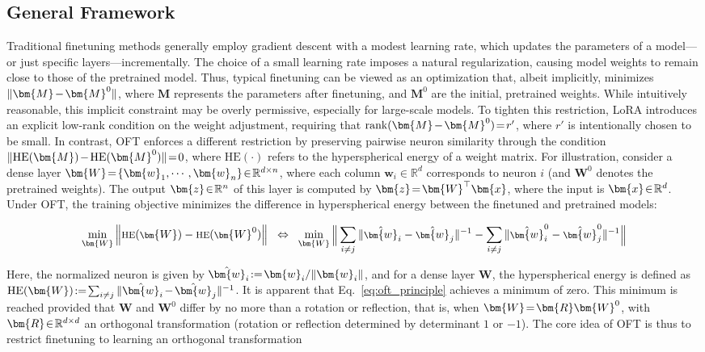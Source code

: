 \subsection{General Framework}

Traditional finetuning methods generally employ gradient descent with a modest learning rate, which updates the parameters of a model—or just specific layers—incrementally. The choice of a small learning rate imposes a natural regularization, causing model weights to remain close to those of the pretrained model. Thus, typical finetuning can be viewed as an optimization that, albeit implicitly, minimizes $\thickmuskip=2mu \medmuskip=2mu \| \bm{M} - \bm{M}^0\|$, where $\bm{M}$ represents the parameters after finetuning, and $\bm{M}^0$ are the initial, pretrained weights. While intuitively reasonable, this implicit constraint may be overly permissive, especially for large-scale models. To tighten this restriction, LoRA introduces an explicit low-rank condition on the weight adjustment, requiring that $\thickmuskip=2mu \medmuskip=2mu \text{rank}(\bm{M} - \bm{M}^0)=r'$, where $r'$ is intentionally chosen to be small. In contrast, OFT enforces a different restriction by preserving pairwise neuron similarity through the condition $\thickmuskip=2mu \medmuskip=2mu \| \text{HE}(\bm{M})-\text{HE}(\bm{M}^0) \|=0$, where $\text{HE}(\cdot)$ refers to the hyperspherical energy of a weight matrix. For illustration, consider a dense layer $\thickmuskip=2mu \medmuskip=2mu \bm{W}=\{\bm{w}_1,\cdots,\bm{w}_n\}\in\mathbb{R}^{d\times n}$, where each column $\bm{w}_i\in\mathbb{R}^{d}$ corresponds to neuron $i$ (and $\bm{W}^0$ denotes the pretrained weights). The output $\thickmuskip=2mu \medmuskip=2mu \bm{z}\in\mathbb{R}^n$ of this layer is computed by $\thickmuskip=2mu \medmuskip=2mu \bm{z}=\bm{W}^\top\bm{x}$, where the input is $\thickmuskip=2mu \medmuskip=2mu \bm{x}\in\mathbb{R}^d$. Under OFT, the training objective minimizes the difference in hyperspherical energy between the finetuned and pretrained models:

\begin{equation}\label{eq:oft_principle}
\footnotesize
\min_{\bm{W}} \left\| \text{HE}(\bm{W})-\text{HE}(\bm{W}^0)\right\|~~\Leftrightarrow~~\min_{\bm{W}} \bigg{\|} \sum_{i\neq j} \|\hat{\bm{w}}_i-\hat{\bm{w}}_j\|^{-1}-\sum_{i\neq j} \|\hat{\bm{w}}^0_i-\hat{\bm{w}}^0_j\|^{-1}\bigg{\|}
\end{equation}

Here, the normalized neuron is given by $\thickmuskip=2mu \medmuskip=2mu \hat{\bm{w}}_i:=\bm{w}_i/\|\bm{w}_i\|$, and for a dense layer $\bm{W}$, the hyperspherical energy is defined as $\thickmuskip=2mu \medmuskip=2mu \text{HE}(\bm{W}):= \sum_{i\neq j} \|\hat{\bm{w}}_i-\hat{\bm{w}}_j\|^{-1}$. It is apparent that Eq.~\eqref{eq:oft_principle} achieves a minimum of zero. This minimum is reached provided that $\bm{W}$ and $\bm{W}^0$ differ by no more than a rotation or reflection, that is, when $\thickmuskip=2mu \medmuskip=2mu \bm{W}=\bm{R}\bm{W}^0$, with $\thickmuskip=2mu \medmuskip=2mu \bm{R}\in\mathbb{R}^{d\times d}$ an orthogonal transformation (rotation or reflection determined by determinant $1$ or $-1$). The core idea of OFT is thus to restrict finetuning to learning an orthogonal transformation

